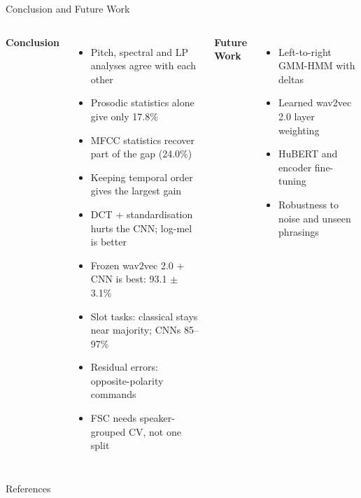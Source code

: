 \documentclass[aspectratio=169,10pt,xcolor=table]{beamer}
\begin{document}
\begin{frame}{Conclusion and Future Work}
\begin{columns}[T]
\textbf{Conclusion}
\small
\begin{itemize}\setlength{\itemsep}{3.5pt}
\item Pitch, spectral and LP analyses agree with each other
\item Prosodic statistics alone give only 17.8\%
\item MFCC statistics recover part of the gap (24.0\%)
\item Keeping temporal order gives the largest gain
\item DCT + standardisation hurts the CNN; log-mel is better
\item Frozen wav2vec 2.0 + CNN is best: 93.1 $\pm$ 3.1\%
\item Slot tasks: classical stays near majority; CNNs 85--97\%
\item Residual errors: opposite-polarity commands
\item FSC needs speaker-grouped CV, not one split
\end{itemize}
\textbf{Future Work}
\small
\begin{itemize}\setlength{\itemsep}{3.5pt}
\item Left-to-right GMM-HMM with deltas \cite{furui1986delta}
\item Learned wav2vec 2.0 layer weighting \cite{yang2021superb}
\item HuBERT and encoder fine-tuning \cite{hsu2021hubert}
\item Robustness to noise and unseen phrasings
\end{itemize}
\end{columns}
\end{frame}

\begin{frame}[allowframebreaks]{References}
\fontsize{5.6}{6.5}\selectfont


\end{frame}
\end{document}
